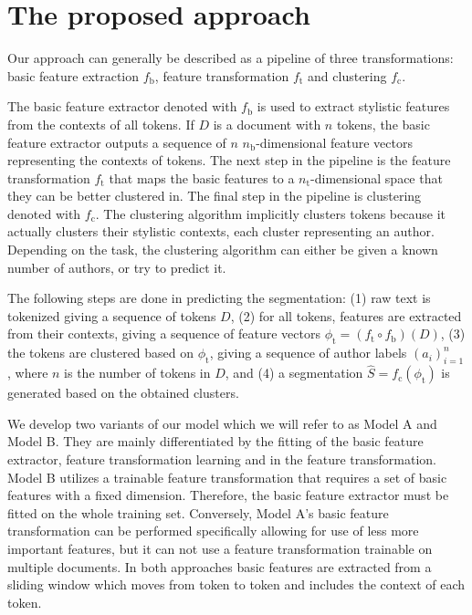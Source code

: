 \documentclass[10pt, a4paper]{article}
\begin{document}
\section{The proposed approach} \label{sec:the-proposed-approach}

Our approach can generally be described as a pipeline of three transformations: basic feature extraction $f_\mathrm{b}$, feature transformation $f_\mathrm{t}$ and clustering $f_\mathrm{c}$.

The basic feature extractor denoted with $f_\mathrm{b}$ is used to extract stylistic features from the contexts of all tokens. If $D$ is a document with $n$ tokens, the basic feature extractor outputs a sequence of $n$ $n_\mathrm{b}$-dimensional feature vectors representing the contexts of tokens. The next step in the pipeline is the feature transformation $f_\mathrm{t}$ that maps the basic features to a $n_\mathrm{t}$-dimensional space that they can be better clustered in. The final step in the pipeline is clustering denoted with $f_\mathrm{c}$. The clustering algorithm implicitly clusters tokens because it actually clusters their stylistic contexts, each cluster representing an author. Depending on the task, the clustering algorithm can either be given a known number of authors, or try to predict it.

The following steps are done in predicting the segmentation: (1) raw text is tokenized giving a sequence of tokens $D$, (2) for all tokens, features are extracted from their contexts, giving a sequence of feature vectors $\phi_\mathrm{t} = (f_\mathrm{t}\circ f_\mathrm{b})(D)$, (3) the tokens are clustered based on $\phi_\mathrm{t}$, giving a sequence of author labels $(a_i)_{i=1}^{n}$, where $n$ is the number of tokens in $D$, and (4) a segmentation $\hat{S}=f_\mathrm{c}(\phi_\mathrm{t})$ is generated based on the obtained clusters.

We develop two variants of our model which we will refer to as Model A and Model B. They are mainly differentiated by the fitting of the basic feature extractor, feature transformation learning and in the feature transformation. Model B utilizes a trainable feature transformation that requires a set of basic features with a fixed dimension. Therefore, the basic feature extractor must be fitted on the whole training set. Conversely, Model A's basic feature transformation can be performed specifically allowing for use of less more important features, but it can not use a feature transformation trainable on multiple documents. In both approaches basic features are extracted from a sliding window which moves from token to token and includes the context of each token.
\end{document}
